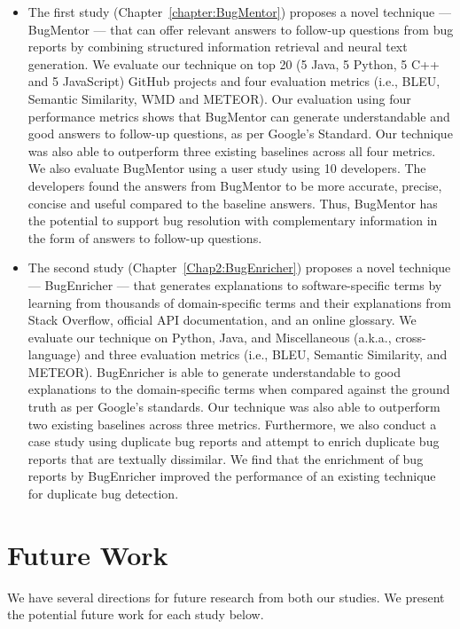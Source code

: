 \begin{itemize}
    \item The first study (Chapter~\ref{chapter:BugMentor}) proposes a novel technique --- BugMentor --- that can offer relevant answers to follow-up questions from bug reports by combining structured information retrieval and neural text generation. We evaluate our technique on top 20 (5 Java, 5 Python, 5 C++ and 5 JavaScript) GitHub projects and four evaluation metrics (i.e., BLEU, Semantic Similarity, WMD and METEOR). Our evaluation using four performance metrics shows that BugMentor can generate understandable and good answers to follow-up questions, as per Google's Standard. Our technique was also able to outperform three existing baselines across all four metrics. We also evaluate BugMentor using a user study using 10 developers. The developers found the answers from BugMentor to be more accurate, precise, concise and useful compared to the baseline answers. Thus, BugMentor has the potential to support bug resolution with complementary information in the form of answers to follow-up questions. 

    \item The second study (Chapter~\ref{Chap2:BugEnricher}) proposes a novel technique --- BugEnricher --- that generates explanations to software-specific terms by learning from thousands of domain-specific terms and their explanations from Stack Overflow, official API documentation, and an online glossary. We evaluate our technique on Python, Java, and Miscellaneous (a.k.a., cross-language) and three evaluation metrics (i.e., BLEU, Semantic Similarity, and METEOR). BugEnricher is able to generate understandable to good explanations to the domain-specific terms when compared against the ground truth as per Google's standards. Our technique was also able to outperform two existing baselines across three metrics. Furthermore, we also conduct a case study using duplicate bug reports and attempt to enrich duplicate bug reports that are textually dissimilar. We find that the enrichment of bug reports by BugEnricher improved the performance of an existing technique for duplicate bug detection.
\end{itemize}

\section{Future Work}
We have several directions for future research from both our studies. We present the potential future work for each study below.

